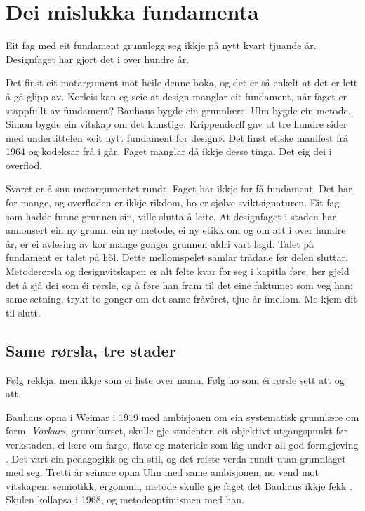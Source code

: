 \chapter{Dei mislukka fundamenta}

\begin{motto}
Eit fag med eit fundament grunnlegg seg ikkje på nytt kvart tjuande år.\\ Designfaget har gjort det i over hundre år.
\end{motto}

Det finst eit motargument mot heile denne boka, og det er så enkelt at det er lett å gå glipp av. Korleis kan eg seie at design manglar eit fundament, når faget er stappfullt av fundament? Bauhaus bygde ein grunnlære. Ulm bygde ein metode. Simon bygde ein vitskap om det kunstige. Krippendorff gav ut tre hundre sider med undertittelen «eit nytt fundament for design». Det finst etiske manifest frå 1964 og kodeksar frå i går. Faget manglar då ikkje desse tinga. Det eig dei i overflod.

Svaret er å snu motargumentet rundt. Faget har ikkje for få fundament. Det har for mange, og overfloden er ikkje rikdom, ho er sjølve sviktsignaturen. Eit fag som hadde funne grunnen sin, ville slutta å leite. At designfaget i staden har annonsert ein ny grunn, ein ny metode, ei ny etikk om og om att i over hundre år, er ei avlesing av kor mange gonger grunnen aldri vart lagd. Talet på fundament er talet på hòl. Dette mellomspelet samlar trådane før delen sluttar. Metoderørsla og designvitskapen er alt felte kvar for seg i kapitla føre; her gjeld det å sjå dei som éi rørsle, og å føre han fram til det eine faktumet som veg han: same setning, trykt to gonger om det same fråvêret, tjue år imellom. Me kjem dit til slutt.

\section{Same rørsla, tre stader}

Følg rekkja, men ikkje som ei liste over namn. Følg ho som éi rørsle sett att og att.

Bauhaus opna i Weimar i 1919 med ambisjonen om ein systematisk grunnlære om form. \emph{Vorkurs}, grunnkurset, skulle gje studenten eit objektivt utgangspunkt før verkstaden, ei lære om farge, flate og materiale som låg under all god formgjeving \autocite{gropius1919, itten1963}. Det vart ein pedagogikk og ein stil, og det reiste verda rundt utan grunnlaget med seg. Tretti år seinare opna Ulm med same ambisjonen, no vend mot vitskapen: semiotikk, ergonomi, metode skulle gje faget det Bauhaus ikkje fekk \autocite{maldonado1958, spitz2002ulm}. Skulen kollapsa i 1968, og metodeoptimismen med han.

